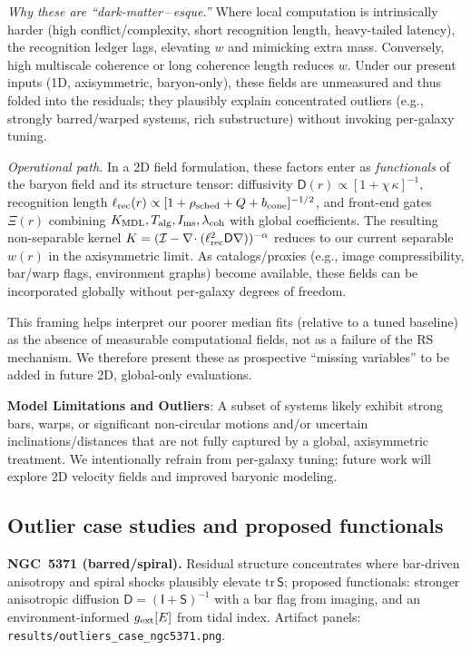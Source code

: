 \documentclass[fleqn,usenatbib]{mnras}
\begin{document}
\noindent \emph{Why these are ``dark-matter\,--\,esque.''} Where local computation is intrinsically harder (high conflict/complexity, short recognition length, heavy-tailed latency), the recognition ledger lags, elevating $w$ and mimicking extra mass. Conversely, high multiscale coherence or long coherence length reduces $w$. Under our present inputs (1D, axisymmetric, baryon-only), these fields are unmeasured and thus folded into the residuals; they plausibly explain concentrated outliers (e.g., strongly barred/warped systems, rich substructure) without invoking per-galaxy tuning.

\noindent \emph{Operational path.} In a 2D field formulation, these factors enter as \emph{functionals} of the baryon field and its structure tensor: diffusivity $\mathsf D(r) \propto [1+\chi\,\kappa]^{-1}$, recognition length $\ell_{\rm rec}(r) \propto [1+\rho_{\rm sched}+Q+b_{\rm cone}]^{-1/2}$, and front-end gates $\Xi(r)$ combining $K_{\rm MDL}, T_{\rm alg}, I_{\rm ms}, \lambda_{\rm coh}$ with global coefficients. The resulting non-separable kernel $K=(\mathcal I-\nabla\!\cdot(\ell_{\rm rec}^2\mathsf D\nabla))^{-\alpha}$ reduces to our current separable $w(r)$ in the axisymmetric limit. As catalogs/proxies (e.g., image compressibility, bar/warp flags, environment graphs) become available, these fields can be incorporated globally without per-galaxy degrees of freedom.

\noindent This framing helps interpret our poorer median fits (relative to a tuned baseline) as the absence of measurable computational fields, not as a failure of the RS mechanism. We therefore present these as prospective ``missing variables'' to be added in future 2D, global-only evaluations.

\textbf{Model Limitations and Outliers}: A subset of systems likely exhibit strong bars, warps, or significant non-circular motions and/or uncertain inclinations/distances that are not fully captured by a global, axisymmetric treatment. We intentionally refrain from per-galaxy tuning; future work will explore 2D velocity fields and improved baryonic modeling.

\subsection{Outlier case studies and proposed functionals}
\noindent \textbf{NGC~5371 (barred/spiral).} Residual structure concentrates where bar-driven anisotropy and spiral shocks plausibly elevate $\mathrm{tr}\,\mathsf S$; proposed functionals: stronger anisotropic diffusion $\mathsf D=(\mathsf I+\mathsf S)^{-1}$ with a bar flag from imaging, and an environment-informed $g_{\rm ext}[E]$ from tidal index. Artifact panels: \texttt{results/outliers\_case\_ngc5371.png}.
\end{document}
